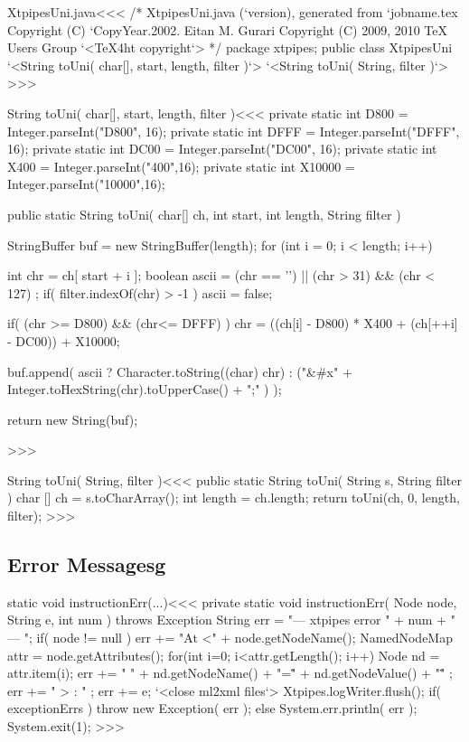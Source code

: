 \documentclass{article}
\begin{document}


\<XtpipesUni.java\><<<
/* XtpipesUni.java (`version), generated from `jobname.tex
   Copyright (C) `CopyYear.2002. Eitan M. Gurari
   Copyright (C) 2009, 2010 TeX Users Group
`<TeX4ht copyright`> */
package xtpipes;
public class XtpipesUni{
   `<String toUni( char[], start, length, filter )`>
   `<String toUni( String, filter )`>
}
>>>

\<String toUni( char[], start, length, filter )\><<<
private static int D800 = Integer.parseInt("D800", 16);
private static int DFFF = Integer.parseInt("DFFF", 16);
private static int DC00 = Integer.parseInt("DC00", 16);
private static int X400 = Integer.parseInt("400",16);
private static int X10000 = Integer.parseInt("10000",16);


public static String toUni( char[] ch, int start, int length,
                                           String filter ){
   StringBuffer buf = new StringBuffer(length);
   for (int i = 0; i < length; i++) {
       int chr = ch[ start + i ];
       boolean ascii =  (chr == '\n')
                        || (chr > 31) && (chr < 127) ;
       if( filter.indexOf(chr) > -1 ){ ascii = false; }

       if( (chr >= D800) && (chr<= DFFF) ){
          chr = ((ch[i] - D800) * X400 + (ch[++i] - DC00)) + X10000;
       }


       buf.append(
         ascii ? Character.toString((char) chr)
               : ("&#x"
                 + Integer.toHexString(chr).toUpperCase()
                 + ";" ) );
   }
   return new String(buf);
}
>>>

\<String toUni( String, filter )\><<<
public static String toUni( String s, String filter ){
   char [] ch = s.toCharArray();
   int length = ch.length;
   return toUni(ch, 0, length, filter);
}
>>>







\subsection{Error Messagesg}






\<static void instructionErr(...)\><<<
private static void instructionErr( Node node, String e, int num )
                                     throws Exception {
   String err = "--- xtpipes error " + num + " --- ";
   if( node != null ){
      err += "At <" + node.getNodeName();
      NamedNodeMap attr = node.getAttributes();
      for(int i=0; i<attr.getLength(); i++){
         Node nd = attr.item(i);
         err += " " +
             nd.getNodeName()  + "=\"" +
             nd.getNodeValue() + "\"" ;
      }
      err += " > : " ;
   }
   err += e;
   `<close ml2xml files`>
   Xtpipes.logWriter.flush();
   if( exceptionErrs ) { throw new Exception( err );  }
   else {
      System.err.println( err );
      System.exit(1);
   }
}
>>>
\end{document}
